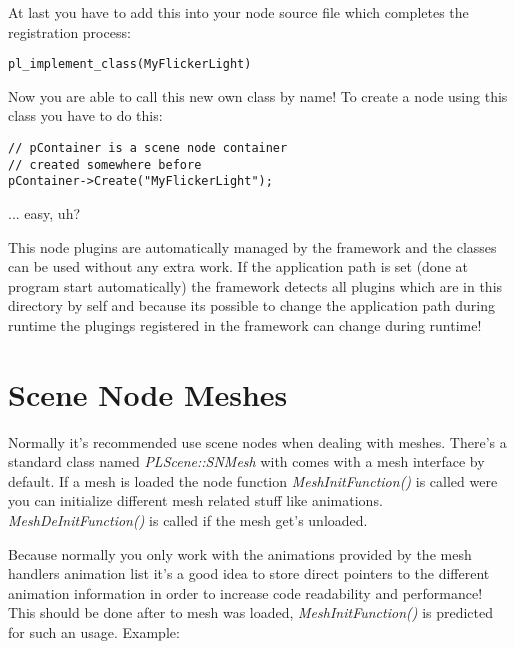 At last you have to add this into your node source file which completes the registration process:

\begin{lstlisting}[caption=Finishing RTTI class registration process]
pl_implement_class(MyFlickerLight)
\end{lstlisting}

Now you are able to call this new own class by name! To create a node using this class you have to do this:

\begin{lstlisting}[caption=Creating an instance of an own scene node class]
// pContainer is a scene node container
// created somewhere before
pContainer->Create("MyFlickerLight");
\end{lstlisting}

... easy, uh?

This node plugins are automatically managed by the framework and the classes can be used without any extra work. If the application path is set (done at program start automatically) the framework detects all plugins which are in this directory by self and because its possible to change the application path during runtime the plugings registered in the framework can change during runtime!




\section{Scene Node Meshes}
Normally it's recommended use scene nodes when dealing with meshes. There's a standard class named \emph{PLScene::SNMesh} with comes with a mesh interface by default. If a mesh is loaded the node function \emph{MeshInitFunction()} is called were you can initialize different mesh related stuff like animations. \emph{MeshDeInitFunction()} is called if the mesh get's unloaded.

Because normally you only work with the animations provided by the mesh handlers animation list it's a good idea to store direct pointers to the different animation information in order to increase code readability and performance! This should be done after to mesh was loaded, \emph{MeshInitFunction()} is predicted for such an usage. Example:

